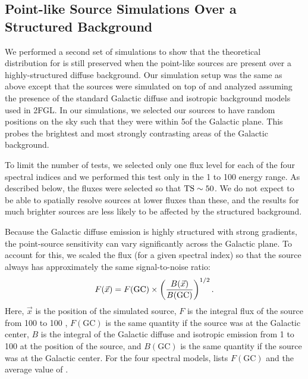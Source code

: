 \subsection{Point-like Source Simulations Over a Structured Background}

We performed a second set of simulations to show that the theoretical
distribution for \tsext is still preserved when the point-like sources
are present over a highly-structured diffuse background.  Our simulation
setup was the same as above except that the sources were simulated on top
of and analyzed assuming the presence of the standard Galactic diffuse
and isotropic background models used in 2FGL.  In our simulations, we
selected our sources to have random positions on the sky such that they
were within 5\degree of the Galactic plane. This probes the brightest
and most strongly contrasting areas of the Galactic background.

To limit the number of tests, we selected only one flux level for each of
the four spectral indices and we performed this test only in the 1 \gev
to 100 \gev energy range.  As described below, the fluxes were selected
so that $\mathrm{TS}\sim50$. We do not expect to be able to spatially resolve
sources at lower fluxes than these, and the results for much brighter
sources are less likely to be affected by the structured background.

Because the Galactic diffuse emission is highly structured with strong
gradients, the point-source sensitivity can vary significantly across
the Galactic plane.  To account for this, we scaled the flux (for a
given spectral index) so that the source always has approximately the
same signal-to-noise ratio:
\begin{equation}
  \eqnlabel{scale_flux_by_background}
  F(\vec{x}) = F(\text{GC}) \times \left(
  \frac{B(\vec{x})}{B(\text{GC})}\right)^{1/2}.
\end{equation}
Here, $\vec{x}$ is the position of the simulated source, $F$ is the
integral flux of the source from 100 \mev to 100 \gev, $F(\text{GC})$
is the same quantity if the source was at the Galactic center, $B$
is the integral of the Galactic diffuse and isotropic emission from 1
\gev to 100 \gev at the position of the source, and $B(\text{GC})$ is
the same quantity if the source was at the Galactic center.  For the
four spectral models,  lists $F(\text{GC})$
and the average value of \ts.

